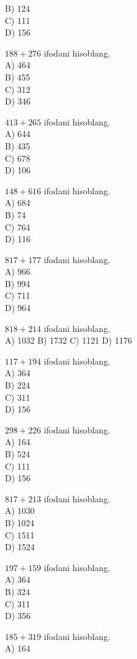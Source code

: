 B) 124\\
C) 111\\
D) 156
  \item $188+276$ ifodani hisoblang.\\
A) 464\\
B) 455\\
C) 312\\
D) 346
  \item $413+265$ ifodani hisoblang.\\
A) 644\\
B) 435\\
C) 678\\
D) 106
  \item $148+616$ ifodani hisoblang.\\
A) 684\\
B) 74\\
C) 764\\
D) 116
  \item $817+177$ ifodani hisoblang.\\
A) 966\\
B) 994\\
C) 711\\
D) 964
  \item $818+214$ ifodani hisoblang.\\
A) 1032 B) 1732 C) 1121 D) 1176
  \item $117+194$ ifodani hisoblang.\\
A) 364\\
B) 224\\
C) 311\\
D) 156
  \item $298+226$ ifodani hisoblang.\\
A) 164\\
B) 524\\
C) 111\\
D) 156
  \item $817+213$ ifodani hisoblang.\\
A) 1030\\
B) 1024\\
C) 1511\\
D) 1524
  \item $197+159$ ifodani hisoblang.\\
A) 364\\
B) 324\\
C) 311\\
D) 356
  \item $185+319$ ifodani hisoblang.\\
A) 164\\
